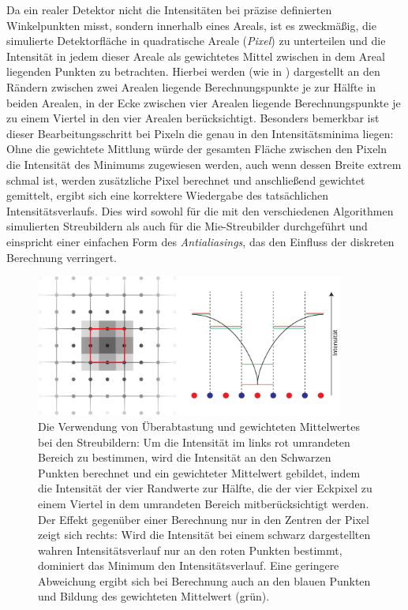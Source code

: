 Da ein realer Detektor nicht die Intensitäten bei präzise definierten Winkelpunkten misst, sondern innerhalb eines Areals, ist es zweckmäßig, die simulierte Detektorfläche in quadratische Areale (\textit{Pixel}) zu unterteilen und die Intensität in jedem dieser Areale als gewichtetes Mittel zwischen in dem Areal liegenden Punkten zu betrachten.
Hierbei werden (wie in ) dargestellt an den Rändern zwischen zwei Arealen liegende Berechnungspunkte je zur Hälfte in beiden Arealen, in der Ecke zwischen vier Arealen liegende Berechnungspunkte je zu einem Viertel in den vier Arealen berücksichtigt.
Besonders bemerkbar ist dieser Bearbeitungsschritt bei Pixeln die genau in den Intensitätsminima liegen: Ohne die gewichtete Mittlung würde der gesamten Fläche zwischen den Pixeln die Intensität des Minimums zugewiesen werden, auch wenn dessen Breite extrem schmal ist, werden zusätzliche Pixel berechnet und anschließend gewichtet gemittelt, ergibt sich eine korrektere Wiedergabe des tatsächlichen Intensitätsverlaufs. Dies wird sowohl für die mit den verschiedenen Algorithmen simulierten Streubildern als auch für die Mie-Streubilder durchgeführt und einspricht einer einfachen Form des \textit{Antialiasings}, das den Einfluss der diskreten Berechnung verringert.
\begin{figure} %
	\centering
	\includegraphics[width=0.9\textwidth]{images/average.pdf}
	\caption[Gewichteter Mittelwert]{Die Verwendung von Überabtastung und gewichteten Mittelwertes bei den Streubildern: Um die Intensität im links rot umrandeten Bereich zu bestimmen, wird die Intensität an den Schwarzen Punkten berechnet und ein gewichteter Mittelwert gebildet, indem die Intensität der vier Randwerte zur Hälfte, die der vier Eckpixel zu einem Viertel in dem umrandeten Bereich mitberücksichtigt werden. Der Effekt gegenüber einer Berechnung nur in den Zentren der Pixel zeigt sich rechts: Wird die Intensität bei einem schwarz dargestellten wahren Intensitätsverlauf nur an den roten Punkten bestimmt, dominiert das Minimum den Intensitätsverlauf. Eine geringere Abweichung ergibt sich bei Berechnung auch an den blauen Punkten und Bildung des gewichteten Mittelwert (grün).}
	\label{fig:average}
\end{figure}%

